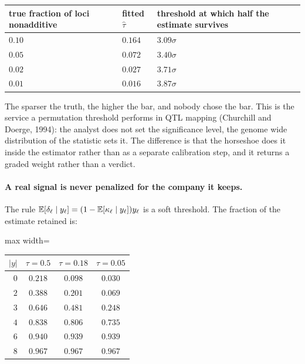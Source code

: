 \begin{center}
\begin{tabularx}{\textwidth}{>{\centering\arraybackslash}X>{\centering\arraybackslash}X>{\centering\arraybackslash}X}
\toprule
true fraction of loci nonadditive & fitted $\hat\tau$ & threshold at which half the estimate survives \\
\midrule
$0.10$ & $0.164$ & $3.09\sigma$ \\
$0.05$ & $0.072$ & $3.40\sigma$ \\
$0.02$ & $0.027$ & $3.71\sigma$ \\
$0.01$ & $0.016$ & $3.87\sigma$ \\
\bottomrule
\end{tabularx}
\end{center}

The sparser the truth, the higher the bar, and nobody chose the bar. This is the service a
permutation threshold performs in QTL mapping (Churchill and Doerge, 1994): the analyst does not
set the significance level, the genome wide distribution of the statistic sets it. The difference
is that the horseshoe does it inside the estimator rather than as a separate calibration step, and
it returns a graded weight rather than a verdict.

\paragraph{A real signal is never penalized for the company it keeps.} The rule
$\mathbb{E}[\delta_\ell\mid y_\ell]=(1-\mathbb{E}[\kappa_\ell\mid y_\ell])y_\ell$ is a soft threshold. The fraction
of the estimate retained is:

\begin{center}
\begin{adjustbox}{max width=\textwidth}
\begin{tabular}{rccc}
\toprule
$|y|$ & $\tau=0.5$ & $\tau=0.18$ & $\tau=0.05$ \\
\midrule
$0$ & $0.218$ & $0.098$ & $0.030$ \\
$2$ & $0.388$ & $0.201$ & $0.069$ \\
$3$ & $0.646$ & $0.481$ & $0.248$ \\
$4$ & $0.838$ & $0.806$ & $0.735$ \\
$6$ & $0.940$ & $0.939$ & $0.939$ \\
$8$ & $0.967$ & $0.967$ & $0.967$ \\
\bottomrule
\end{tabular}
\end{adjustbox}
\end{center}

